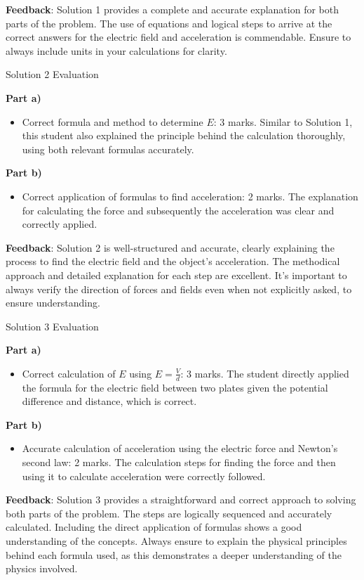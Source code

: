 \documentclass[a4paper,11pt]{article}
\begin{document}
\textbf{Feedback}: Solution 1 provides a complete and accurate explanation for both parts of the problem. The use of equations and logical steps to arrive at the correct answers for the electric field and acceleration is commendable. Ensure to always include units in your calculations for clarity.

Solution 2 Evaluation

\textbf{Part a)}
\begin{itemize}
    \item Correct formula and method to determine \(E\): 3 marks. Similar to Solution 1, this student also explained the principle behind the calculation thoroughly, using both relevant formulas accurately.
\end{itemize}

\textbf{Part b)}
\begin{itemize}
    \item Correct application of formulas to find acceleration: 2 marks. The explanation for calculating the force and subsequently the acceleration was clear and correctly applied.
\end{itemize}

\textbf{Feedback}: Solution 2 is well-structured and accurate, clearly explaining the process to find the electric field and the object's acceleration. The methodical approach and detailed explanation for each step are excellent. It's important to always verify the direction of forces and fields even when not explicitly asked, to ensure understanding.

Solution 3 Evaluation

\textbf{Part a)}
\begin{itemize}
    \item Correct calculation of \(E\) using \(E = \frac{V}{d}\): 3 marks. The student directly applied the formula for the electric field between two plates given the potential difference and distance, which is correct.
\end{itemize}

\textbf{Part b)}
\begin{itemize}
    \item Accurate calculation of acceleration using the electric force and Newton's second law: 2 marks. The calculation steps for finding the force and then using it to calculate acceleration were correctly followed.
\end{itemize}

\textbf{Feedback}: Solution 3 provides a straightforward and correct approach to solving both parts of the problem. The steps are logically sequenced and accurately calculated. Including the direct application of formulas shows a good understanding of the concepts. Always ensure to explain the physical principles behind each formula used, as this demonstrates a deeper understanding of the physics involved.
\end{document}
